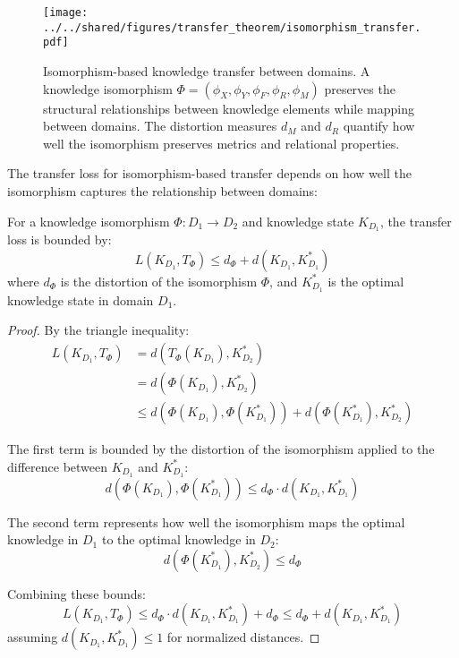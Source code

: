\begin{figure}[ht]
    \centering
    \texttt{[image: ../../shared/figures/transfer\_theorem/isomorphism\_transfer.pdf]}
    \caption{Isomorphism-based knowledge transfer between domains. A knowledge isomorphism $\Phi = (\phi_X, \phi_Y, \phi_F, \phi_R, \phi_M)$ preserves the structural relationships between knowledge elements while mapping between domains. The distortion measures $d_M$ and $d_R$ quantify how well the isomorphism preserves metrics and relational properties.}
    \label{fig:isomorphism_transfer}
\end{figure}

The transfer loss for isomorphism-based transfer depends on how well the isomorphism captures the relationship between domains:

\begin{theorem}
For a knowledge isomorphism $\Phi: D_1 \to D_2$ and knowledge state $K_{D_1}$, the transfer loss is bounded by:
\begin{equation}
L(K_{D_1}, T_{\Phi}) \leq d_{\Phi} + d(K_{D_1}, K_{D_1}^*)
\end{equation}
where $d_{\Phi}$ is the distortion of the isomorphism $\Phi$, and $K_{D_1}^*$ is the optimal knowledge state in domain $D_1$.
\end{theorem}

\begin{proof}
By the triangle inequality:
\begin{align}
L(K_{D_1}, T_{\Phi}) &= d(T_{\Phi}(K_{D_1}), K_{D_2}^*) \\
&= d(\Phi(K_{D_1}), K_{D_2}^*) \\
&\leq d(\Phi(K_{D_1}), \Phi(K_{D_1}^*)) + d(\Phi(K_{D_1}^*), K_{D_2}^*)
\end{align}

The first term is bounded by the distortion of the isomorphism applied to the difference between $K_{D_1}$ and $K_{D_1}^*$:
\begin{equation}
d(\Phi(K_{D_1}), \Phi(K_{D_1}^*)) \leq d_{\Phi} \cdot d(K_{D_1}, K_{D_1}^*)
\end{equation}

The second term represents how well the isomorphism maps the optimal knowledge in $D_1$ to the optimal knowledge in $D_2$:
\begin{equation}
d(\Phi(K_{D_1}^*), K_{D_2}^*) \leq d_{\Phi}
\end{equation}

Combining these bounds:
\begin{equation}
L(K_{D_1}, T_{\Phi}) \leq d_{\Phi} \cdot d(K_{D_1}, K_{D_1}^*) + d_{\Phi} \leq d_{\Phi} + d(K_{D_1}, K_{D_1}^*)
\end{equation}
assuming $d(K_{D_1}, K_{D_1}^*) \leq 1$ for normalized distances.
\end{proof}

